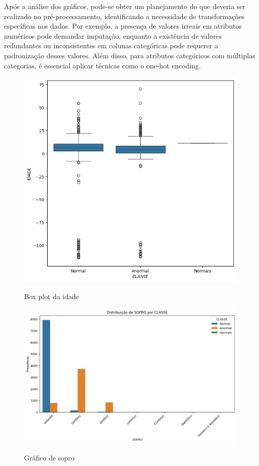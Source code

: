 \documentclass[10pt, conference, compsocconf]{IEEEtran}
\begin{document}
Após a análise dos gráficos, pode-se obter um planejamento do que deveria ser realizado no pré-processamento, 
identificando a necessidade de transformações específicas nos dados. Por exemplo, a presença de valores irreais em 
atributos numéricos pode demandar imputação, enquanto a existência de valores redundantes ou inconsistentes em colunas 
categóricas pode requerer a padronização desses valores. Além disso, para atributos categóricos com múltiplas categorias, 
é essencial aplicar técnicas como o one-hot encoding.
\begin{figure}[htbp]
  \centering
  \begin{minipage}{0.2\textwidth} %
    \centering
    \includegraphics[width=\textwidth]{box_plot_idade.png} %
    \tiny{\caption{Box plot da idade}}
    \label{fig:box_plot_idade}
  \end{minipage}
  \hfill %
  \begin{minipage}{0.2\textwidth}
    \centering
    \includegraphics[width=\textwidth]{sopro.png} %
    \tiny{\caption{Gráfico de sopro}}
    \label{fig:sopro}
  \end{minipage}
  \label{fig:exemplo}
\end{figure}
\end{document}
